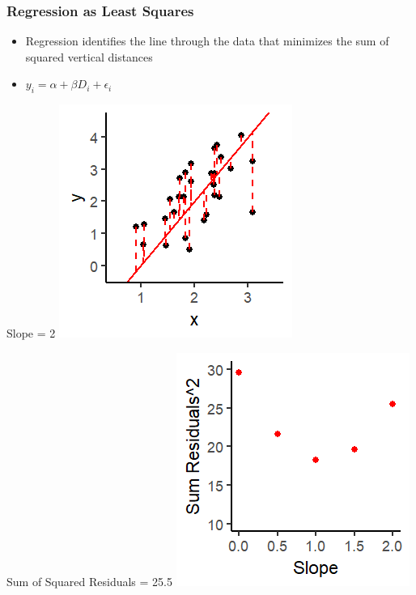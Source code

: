 \documentclass[xcolor=x11names,compress]{beamer}\usepackage[]{graphicx}\usepackage[]{color}
\makeatletter
\def\maxwidth{ %
  \ifdim\Gin@nat@width>\linewidth
    \linewidth
  \else
    \Gin@nat@width
  \fi
}
\newenvironment{knitrout}{}{} %
\renewcommand{\(}{\begin{columns}}
\renewcommand{\)}{\end{columns}}
\newcommand{\<}[1]{\begin{column}{#1}}
\renewcommand{\>}{\end{column}}
\makeatother
\begin{document}
\begin{frame}
\frametitle{Regression as Least Squares}
\begin{itemize}
\item Regression identifies the line through the data that minimizes the sum of squared vertical distances 
\item $y_i = \alpha + \beta D_i + \epsilon_i$
\end{itemize}
\begin{multicols}{2}
Slope = 2
\begin{knitrout}
\color{fgcolor}
\includegraphics[width=\maxwidth]{figure/graph_ols5-1} 

\end{knitrout}
\columnbreak
Sum of Squared Residuals = 25.5
\begin{knitrout}
\color{fgcolor}
\includegraphics[width=\maxwidth]{figure/graph_ssr5-1} 

\end{knitrout}
\end{multicols}
\end{frame}
\end{document}
